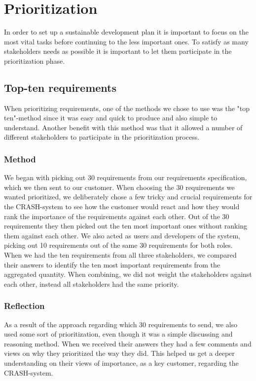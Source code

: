 \documentclass[10pt]{article}
\begin{document}
\section{Prioritization}
In order to set up a sustainable development plan it is important to focus on the most vital tasks before continuing to the less important ones. To satisfy as many stakeholders needs as possible it is important to let them participate in the prioritization phase.

\subsection{Top-ten requirements}
When prioritizing requirements, one of the methods we chose to use was the "top ten"-method since it was easy and quick to produce and also simple to understand. Another benefit with this method was that it allowed a number of different stakeholders to participate in the prioritization process.
\subsubsection{Method}
We began with picking out 30 requirements from our requirements specification, which we then sent to our customer. When choosing the 30 requirements we wanted prioritized, we deliberately chose a few tricky and crucial requirements for the CRASH-system to see how the customer would react and how they would rank the importance of the requirements against each other. Out of the 30 requirements they then picked out the ten most important ones without ranking them against each other. We also acted as users and developers of the system, picking out 10 requirements out of the same 30 requirements for both roles. When we had the ten requirements from all three stakeholders, we compared their answers to identify the ten most important requirements from the aggregated quantity. When combining, we did not weight the stakeholders against each other, instead all stakeholders had the same priority.

\subsubsection{Reflection}
As a result of the approach regarding which 30 requirements to send, we also used some sort of prioritization, even though it was a simple discussing and reasoning method. When we received their answers they had a few comments and views on why they prioritized the way they did. This helped us get a deeper understanding on their views of importance, as a key customer, regarding the CRASH-system. 
\end{document}
